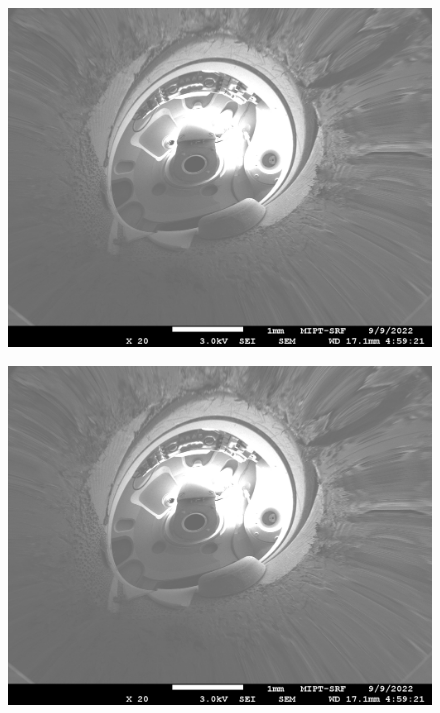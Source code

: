 \documentclass[a4paper,12pt]{article}
\begin{document}
\begin{figure}[h!]
\centering
\begin{minipage}{.5\textwidth}
  \centering
  \includegraphics[width=1\linewidth]{Foam009.jpg}
  \label{fig:Inside1}
\end{minipage}%
\begin{minipage}{.5\textwidth}
  \centering
  \includegraphics[width=1\linewidth]{Foam009.jpg}
  \label{fig:Inside2}
\end{minipage}
\end{figure}
\end{document}
